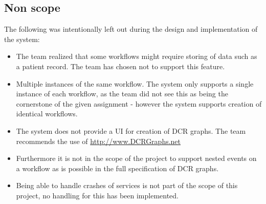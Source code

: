 \subsection{Non scope}
The following was intentionally left out during the design and implementation of the system:

\begin{itemize}
\item The team realized that some workflows might require storing of data such as a patient record. The team has chosen not to support this feature. 
\item Multiple instances of the same workflow. The system only supports a single instance of each workflow, as the team did not see this as being the cornerstone of the given assignment - however the system supports creation of identical workflows. 
\item The system does not provide a UI for creation of DCR graphs. The team recommends the use of \url{http://www.DCRGraphs.net}
\item Furthermore it is not in the scope of the project to support nested events on a workflow as is possible in the full specification of  DCR graphs.
\item Being able to handle crashes of services is not part of the scope of this project, no handling for this has been implemented.
\end{itemize}
